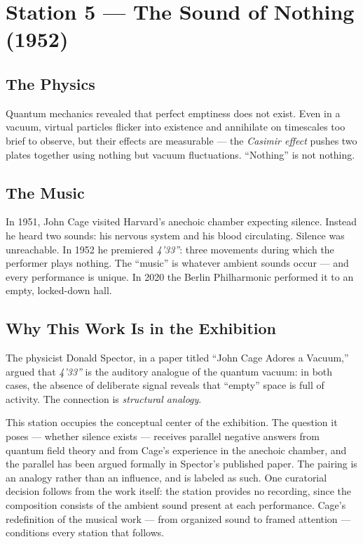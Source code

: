 \documentclass[11pt]{article}
\begin{document}
\section{Station 5 --- The Sound of Nothing (1952)}

\subsection{The Physics}
Quantum mechanics revealed that perfect emptiness does not exist. Even in a vacuum, virtual
particles flicker into existence and annihilate on timescales too brief to observe, but their
effects are measurable --- the \emph{Casimir effect} pushes two plates together using nothing
but vacuum fluctuations. ``Nothing'' is not nothing.

\subsection{The Music}
In 1951, John Cage visited Harvard's anechoic chamber expecting silence. Instead he heard two
sounds: his nervous system and his blood circulating. Silence was unreachable. In 1952 he
premiered \emph{4'33''}: three movements during which the performer plays nothing. The
``music'' is whatever ambient sounds occur --- and every performance is unique. In 2020 the
Berlin Philharmonic performed it to an empty, locked-down hall.

\subsection{Why This Work Is in the Exhibition}
The physicist Donald Spector, in a paper titled ``John Cage Adores a Vacuum,'' argued that
\emph{4'33''} is the auditory analogue of the quantum vacuum: in both cases, the absence of
deliberate signal reveals that ``empty'' space is full of activity. The connection is
\emph{structural analogy}.

This station occupies the conceptual center of the exhibition. The question it poses ---
whether silence exists --- receives parallel negative answers from quantum field theory and
from Cage's experience in the anechoic chamber, and the parallel has been argued formally in
Spector's published paper. The pairing is an analogy rather than an influence, and is labeled
as such. One curatorial decision follows from the work itself: the station provides no
recording, since the composition consists of the ambient sound present at each performance.
Cage's redefinition of the musical work --- from organized sound to framed attention ---
conditions every station that follows.
\end{document}
